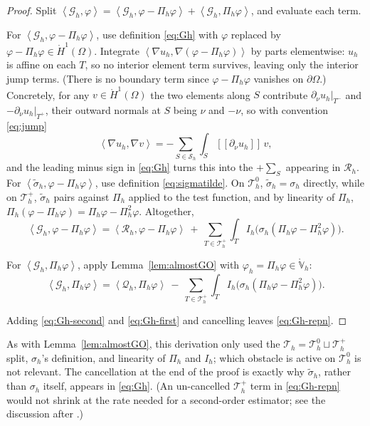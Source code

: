 \documentclass[12pt]{amsart}
\theoremstyle{definition}
\newcommand{\Om}{\Omega}
\newcommand{\dOm}{\partial\Omega}
\newcommand{\Th}{\mathcal{T}_h}
\newcommand{\Vhr}{\mathring{\mathbb{V}}_h}
\newcommand{\Sh}{\mathcal{S}_h}
\newcommand{\Ih}{I_h}
\newcommand{\Pih}{\Pi_h}
\newcommand{\Thplus}{\Th^+}
\newcommand{\Thzero}{\Th^0}
\newcommand{\Gh}{\mathcal{G}_h}
\newcommand{\Rh}{\mathcal{R}_h}
\newcommand{\Qh}{\mathcal{Q}_h}
\newcommand{\jump}[1]{[\![#1]\!]}
\begin{document}
\begin{proof}
Split $\left<\Gh,\varphi\right> = \left<\Gh,\varphi-\Pih\varphi\right> + \left<\Gh,\Pih\varphi\right>$, and evaluate each term.

For $\left<\Gh,\varphi-\Pih\varphi\right>$, use definition \eqref{eq:Gh} with $\varphi$ replaced by $\varphi - \Pih\varphi \in \mathring H^1(\Om)$.  Integrate $\left<\nabla u_h,\nabla(\varphi-\Pih\varphi)\right>$ by parts elementwise: $u_h$ is affine on each $T$, so no interior element term survives, leaving only the interior jump terms.  (There is no boundary term since $\varphi-\Pih\varphi$ vanishes on $\dOm$.)  Concretely, for any $v \in \mathring H^1(\Om)$ the two elements along $S$ contribute $\partial_\nu u_h|_{T^-}$ and $-\partial_\nu u_h|_{T^+}$, their outward normals at $S$ being $\nu$ and $-\nu$, so with convention \eqref{eq:jump}
\begin{equation}
\label{eq:byparts}
  \left<\nabla u_h,\nabla v\right> = -\sum_{S\in\Sh}\int_S \jump{\partial_\nu u_h}\,v,
\end{equation}
and the leading minus sign in \eqref{eq:Gh} turns this into the $+\sum_S$ appearing in $\Rh$.  For $\left<\tilde\sigma_h,\varphi-\Pih\varphi\right>$, use definition \eqref{eq:sigmatilde}.  On $\Thzero$, $\tilde\sigma_h=\sigma_h$ directly, while on $\Thplus$, $\tilde\sigma_h$ pairs against $\Pih$ applied to the test function, and by linearity of $\Pih$, $\Pih(\varphi-\Pih\varphi) = \Pih\varphi - \Pih^2\varphi$.  Altogether,
\begin{equation}
\label{eq:Gh-first}
  \left<\Gh,\varphi-\Pih\varphi\right> = \left<\Rh,\varphi-\Pih\varphi\right> \ +\ \sum_{T\in\Thplus}\int_T \Ih\bigl(\sigma_h(\Pih\varphi-\Pih^2\varphi)\bigr).
\end{equation}

For $\left<\Gh,\Pih\varphi\right>$, apply Lemma~\ref{lem:almostGO} with $\varphi_h=\Pih\varphi\in\Vhr$:
\begin{equation}
\label{eq:Gh-second}
  \left<\Gh,\Pih\varphi\right> = \left<\Qh,\Pih\varphi\right> \ -\ \sum_{T\in\Thplus}\int_T \Ih\bigl(\sigma_h(\Pih\varphi-\Pih^2\varphi)\bigr).
\end{equation}

Adding \eqref{eq:Gh-second} and \eqref{eq:Gh-first} and cancelling leaves \eqref{eq:Gh-repn}.
\end{proof}

As with Lemma~\ref{lem:almostGO}, this derivation only used the $\Th = \Thzero \sqcup \Thplus$ split, $\sigma_h$'s definition, and linearity of $\Pih$ and $\Ih$; which obstacle is active on $\Thzero$ is not relevant.  The cancellation at the end of the proof is exactly why $\tilde\sigma_h$, rather than $\sigma_h$ itself, appears in \eqref{eq:Gh}.  (An un-cancelled $\Thplus$ term in \eqref{eq:Gh-repn} would not shrink at the rate needed for a second-order estimator; see the discussion after \cite[formula (3.6)]{NSV03}.)
\end{document}
